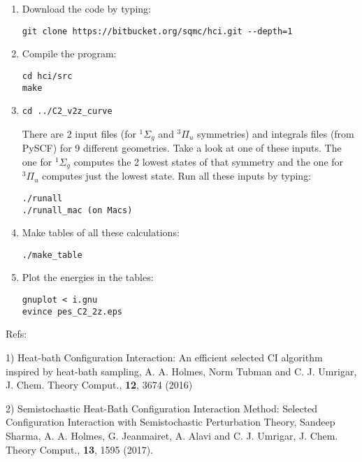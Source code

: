 \documentclass[12pt,aps,prb,groupedaddress,amsmath,amssymb]{revtex4-1}
\begin{document}
\begin{enumerate}
\item Download the code by typing:\vspace{-5mm}
\begin{verbatim}
git clone https://bitbucket.org/sqmc/hci.git --depth=1
\end{verbatim}
\item
Compile the program:\vspace{-5mm}
\begin{verbatim}
cd hci/src
make
\end{verbatim}
\item
\begin{verbatim}
cd ../C2_v2z_curve
\end{verbatim}
There are 2 input files (for $^1\Sigma_g$ and $^3\Pi_u$ symmetries) and integrals files (from PySCF) for 9 different geometries.  Take a look at one of these inputs.
The one for $^1\Sigma_g$ computes the 2 lowest states of that symmetry and the one for $^3\Pi_u$ computes just the lowest state.
Run all these inputs by typing:
\begin{verbatim}
./runall
./runall_mac (on Macs)
\end{verbatim}
\item Make tables of all these calculations:\vspace{-5mm}
\begin{verbatim}
./make_table
\end{verbatim}
\item Plot the energies in the tables:\vspace{-5mm}
\begin{verbatim}
gnuplot < i.gnu
evince pes_C2_2z.eps
\end{verbatim}
\end{enumerate}

\vskip 9mm
Refs:
\small


1) Heat-bath Configuration Interaction: An efficient selected CI algorithm inspired by heat-bath sampling,
A. A. Holmes, Norm Tubman and C. J. Umrigar, J. Chem. Theory Comput., {\bf 12}, 3674 (2016)

2) Semistochastic Heat-Bath Configuration Interaction Method:
Selected Configuration Interaction with Semistochastic Perturbation Theory,
Sandeep Sharma, A. A. Holmes, G. Jeanmairet, A. Alavi and C. J. Umrigar, J. Chem. Theory Comput., {\bf 13}, 1595 (2017).
\end{document}
